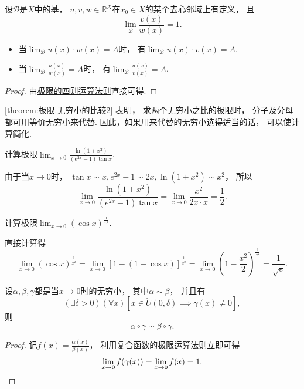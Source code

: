 \begin{theorem}\label{theorem:极限.无穷小的比较2}
设\(\mathcal{B}\)是\(X\)中的基，
\(u,v,w\in\mathbb{R}^X\)在\(x_0 \in X\)的某个去心邻域上有定义，
且\[
	\lim_\mathcal{B} \frac{v(x)}{w(x)} = 1.
\]
\begin{itemize}
	\item 当\(\lim_\mathcal{B} u(x) \cdot w(x) = A\)时，
	有\(\lim_\mathcal{B} u(x) \cdot v(x) = A\).

	\item 当\(\lim_\mathcal{B} \frac{u(x)}{w(x)} = A\)时，
	有\(\lim_\mathcal{B} \frac{u(x)}{v(x)} = A\).
\end{itemize}
\begin{proof}
由\hyperref[theorem:极限.极限的四则运算法则]{极限的四则运算法则}直接可得.
\end{proof}
\end{theorem}

\cref{theorem:极限.无穷小的比较2} 表明，
求两个无穷小之比的极限时，
分子及分母都可用等价无穷小来代替.
因此，如果用来代替的无穷小选得适当的话，
可以使计算简化.

\begin{example}
计算极限\(\lim_{x\to0} \frac{\ln(1+x^2)}{(e^{2x}-1) \tan x}\).
\begin{solution}
由于当\(x\to0\)时，
\(\tan x \sim x,
e^{2x}-1 \sim 2x,
\ln(1+x^2) \sim x^2\)，
所以\[
	\lim_{x\to0} \frac{\ln(1+x^2)}{(e^{2x}-1) \tan x}
	= \lim_{x\to0} \frac{x^2}{2x \cdot x}
	= \frac12.
\]
\end{solution}
\end{example}

\begin{example}
计算极限\(\lim_{x\to0} (\cos x)^{\frac1{x^2}}\).
\begin{solution}
直接计算得\[
	\lim_{x\to0} (\cos x)^{\frac1{x^2}}
	= \lim_{x\to0} [1-(1-\cos x)]^{\frac1{x^2}}
	= \lim_{x\to0} \left(1-\frac{x^2}2\right)^{\frac1{x^2}}
	= \frac1{\sqrt{e}}.
\]
\end{solution}
\end{example}

\begin{proposition}[等价无穷小的换元法]
设\(\alpha,\beta,\gamma\)都是当\(x\to0\)时的无穷小，
其中\(\alpha \sim \beta\)，
并且有\[
	(\exists\delta>0)
	(\forall x)
	[
		x\in\mathring{U}(0,\delta)
		\implies
		\gamma(x) \neq 0
	],
\]
则\[
	\alpha\circ\gamma \sim \beta\circ\gamma.
\]
\begin{proof}
记\(f(x) = \frac{\alpha(x)}{\beta(x)}\)，
利用\hyperref[theorem:极限.复合函数的极限运算法则1]{复合函数的极限运算法则}立即可得\[
	\lim_{x\to0} f(\gamma(x))
	= \lim_{x\to0} f(x)
	= 1.
	\qedhere
\]
\end{proof}
\end{proposition}

